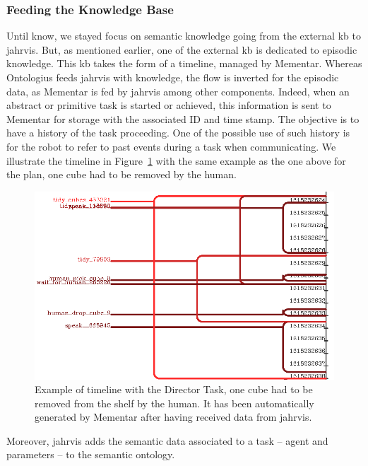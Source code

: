 \documentclass[a4paper,11pt,twoside]{StyleThese}
\begin{document}
\subsubsection{Feeding the Knowledge Base}\label{chap2:subsec:feeding}
Until know, we stayed focus on semantic knowledge going from the external \acrshort{kb} to \acrshort{jahrvis}. But, as mentioned earlier, one of the external \acrshort{kb} is dedicated to episodic knowledge. This \acrshort{kb} takes the form of a timeline, managed by Mementar. Whereas Ontologius feeds \acrshort{jahrvis} with knowledge, the flow is inverted for the episodic data, as Mementar is fed by \acrshort{jahrvis} among other components. Indeed, when an abstract or primitive task is started or achieved, this information is sent to Mementar for storage with the associated ID and time stamp. The objective is to have a history of the task proceeding. One of the possible use of such history is for the robot to refer to past events during a task when communicating. We illustrate the timeline in Figure~\ref{chap2:fig:timeline} with the same example as the one above for the plan, one cube had to be removed by the human.

\begin{figure}[!ht]
	\includegraphics[width=\linewidth]{figures/chapter2/timeline.png}
	\caption{Example of timeline with the Director Task, one cube had to be removed from the shelf by the human. It has been automatically generated by Mementar after having received data from \acrshort{jahrvis}.}
	\label{chap2:fig:timeline}
\end{figure}

Moreover, \acrshort{jahrvis} adds the semantic data associated to a task -- agent and parameters -- to the semantic ontology.
\end{document}
